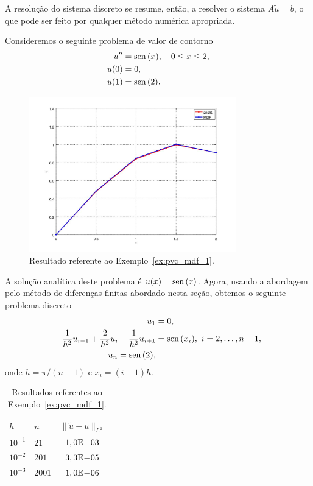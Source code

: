 A resolução do sistema discreto se resume, então, a resolver o sistema $A\tilde{u} = b$, o que pode ser feito por qualquer método numérica apropriada.


\begin{ex}\label{ex:pvc_mdf_1}
  Consideremos o seguinte problema de valor de contorno
  \begin{align}
    -u'' &= \operatorname{sen}\,(x),\quad 0\leq x \leq 2,\\
    u(0) &= 0,\\
    u(1) &= \operatorname{sen}\,(2).
  \end{align}

\begin{figure}[h!]
  \centering
  \includegraphics[width=0.8\textwidth]{./cap_pvc/dados/ex_pvc_mdf_1/ex_pvc_mdf_1}
  \caption{Resultado referente ao Exemplo~\ref{ex:pvc_mdf_1}.}
  \label{fig:ex_pvc_mdf_1}
\end{figure}

A solução analítica deste problema é $u(x) = \operatorname{sen}\,(x)$. Agora, usando a abordagem pelo método de diferenças finitas abordado nesta seção, obtemos o seguinte problema discreto
\begin{align}
  u_1 &= 0,\\
  -\frac{1}{h^2}u_{i-1} + \frac{2}{h^2}u_i - \frac{1}{h^2}u_{i+1} &= \operatorname{sen}\,(x_i),~i=2, \dotsc, n-1,\\
  u_n = \operatorname{sen}\,(2),
\end{align}
onde $h=\pi/(n-1)$ e $x_i = (i-1)h$.

\begin{table}[h!]
  \centering
  \begin{tabular}{ll|c}
    $h$ & $n$ & $\|\tilde{u} - u\|_{L^2}$ \\\hline
    $10^{-1}$ & $21$ & $1,0\mathrm{E}\!-\!03$ \\
    $10^{-2}$ & $201$ & $3,3\mathrm{E}\!-\!05$ \\
    $10^{-3}$ & $2001$ & $1,0\mathrm{E}\!-\!06$ \\\hline
  \end{tabular}
  \caption{Resultados referentes ao Exemplo~\ref{ex:pvc_mdf_1}.}
  \label{tab:ex_pvc_mdf_1}
\end{table}


\end{ex}
